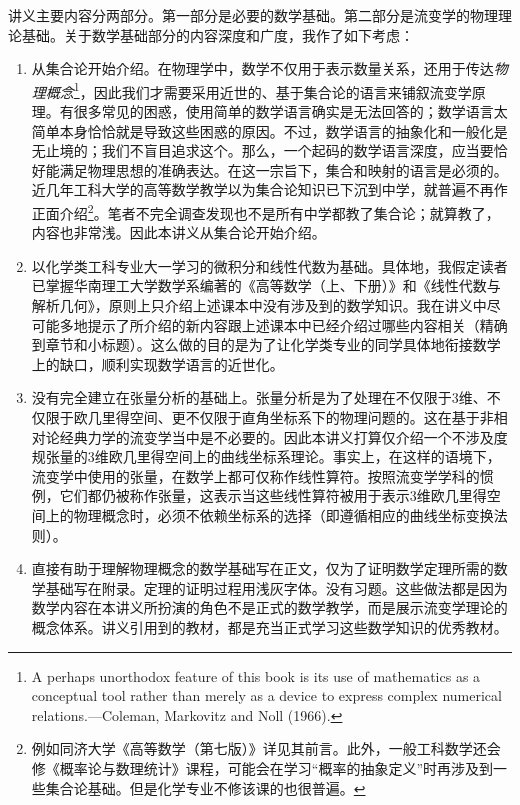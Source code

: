 \documentclass[main.tex]{subfiles}
\begin{document}
讲义主要内容分两部分。第一部分是必要的数学基础。第二部分是流变学的物理理论基础。关于数学基础部分的内容深度和广度，我作了如下考虑：
\begin{enumerate}
      \item 从集合论开始介绍。在物理学中，数学不仅用于表示数量关系，还用于传达\emph{物理概念}\footnote{A perhaps unorthodox feature of this book is its use of mathematics as a conceptual tool rather than merely as a device to express complex numerical relations.---Coleman, Markovitz and Noll (1966)\cite{Coleman1966}.}，因此我们才需要采用近世的、基于集合论的语言来铺叙流变学原理。有很多常见的困惑，使用简单的数学语言确实是无法回答的；数学语言太简单本身恰恰就是导致这些困惑的原因。不过，数学语言的抽象化和一般化是无止境的；我们不盲目追求这个。那么，一个起码的数学语言深度，应当要恰好能满足物理思想的准确表达。在这一宗旨下，集合和映射的语言是必须的。近几年工科大学的高等数学教学以为集合论知识已下沉到中学，就普遍不再作正面介绍\footnote{例如同济大学《高等数学（第七版）》详见其前言。此外，一般工科数学还会修《概率论与数理统计》课程，可能会在学习“概率的抽象定义”时再涉及到一些集合论基础。但是化学专业不修该课的也很普遍。}。笔者不完全调查发现也不是所有中学都教了集合论；就算教了，内容也非常浅。因此本讲义从集合论开始介绍。
      \item 以化学类工科专业大一学习的微积分和线性代数为基础。具体地，我假定读者已掌握华南理工大学数学系编著的《高等数学（上、下册）》和《线性代数与解析几何》，原则上只介绍上述课本中没有涉及到的数学知识。我在讲义中尽可能多地提示了所介绍的新内容跟上述课本中已经介绍过哪些内容相关（精确到章节和小标题）。这么做的目的是为了让化学类专业的同学具体地衔接数学上的缺口，顺利实现数学语言的近世化。
      \item 没有完全建立在张量分析的基础上。张量分析是为了处理在不仅限于3维、不仅限于欧几里得空间、更不仅限于直角坐标系下的物理问题的。这在基于非相对论经典力学的流变学当中是不必要的。因此本讲义打算仅介绍一个不涉及度规张量的3维欧几里得空间上的曲线坐标系理论。事实上，在这样的语境下，流变学中使用的张量，在数学上都可仅称作线性算符。按照流变学学科的惯例，它们都仍被称作张量，这表示当这些线性算符被用于表示3维欧几里得空间上的物理概念时，必须不依赖坐标系的选择（即遵循相应的曲线坐标变换法则）。
      \item 直接有助于理解物理概念的数学基础写在正文，仅为了证明数学定理所需的数学基础写在附录。定理的证明过程用浅灰字体。没有习题。这些做法都是因为数学内容在本讲义所扮演的角色不是正式的数学教学，而是展示流变学理论的概念体系。讲义引用到的教材，都是充当正式学习这些数学知识的优秀教材。
\end{enumerate}
\end{document}
